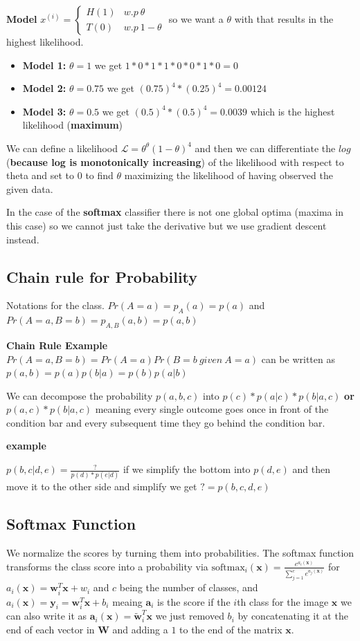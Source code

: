 \documentclass[twocolumn, letter, 10pt, landscape]{article}
\newcommand{\mb}{\mathbf}
\newcommand{\tb}{\textbf}
\newcommand{\bit}{\vspace{-0.1in}\begin{itemize}\setlength\itemsep{-0.05in}}
\newcommand{\eit}{\end{itemize}\vspace{-0.1in}}
\begin{document}
\tb{Model} $x^{(i)}= \begin{cases} H (1)& w.p \: \theta \\ T (0) & w.p \: 1-\theta \end{cases}$ so we want a $\theta$ with that results in the highest likelihood.

\bit{}
\item \tb{Model 1:} $\theta = 1$ we get $1*0*1*1*0*0*1*0 = 0$
\item \tb{Model 2:} $\theta = 0.75$ we get $(0.75)^4*(0.25)^4 = 0.00124$
\item \tb{Model 3:} $\theta = 0.5$ we get $(0.5)^4*(0.5)^4 = 0.0039$ which is the highest likelihood (\tb{maximum})
\eit{}

We can define a likelihood $\mathcal{L} = \theta^\theta(1-\theta)^4$ and then we can differentiate the $log$ (\tb{because log is monotonically increasing}) of the likelihood with respect to theta and set to $0$ to find $\theta$ maximizing the likelihood of having observed the given data.

In the case of the \tb{softmax} classifier there is not one global optima (maxima in this case) so we cannot just take the derivative but we use gradient descent instead.

\subsection{Chain rule for Probability}
Notations for the class. $Pr(A=a)= p_A(a) = p(a)$ and $Pr(A=a, B=b) = p_{A,B}(a,b)=p(a,b)$

\tb{Chain Rule Example}
$Pr(A=a, B=b) = Pr(A=a)Pr(B=b \: given \: A=a)$ can be written as $p(a,b) = p(a)p(b|a) = p(b)p(a|b)$

We can decompose the probability $p(a,b,c)$ into $p(c)*p(a|c)*p(b|a,c)$ \tb{or} $p(a,c)*p(b|a,c)$ meaning every single outcome goes once in front of the condition bar and every subsequent time they go behind the condition bar.

\tb{example}

$p(b,c|d,e) = \frac{?}{p(d)*p(e|d)}$ if we simplify the bottom into $p(d,e)$ and then move it to the other side and simplify we get $? = p(b,c,d,e)$

\subsection{Softmax Function}
We normalize the scores by turning them into probabilities. The softmax function transforms the class score into a probability via $\text{softmax}_i(\mb{x}) = \frac{e^{a_i(\mb{x})}}{\sum_{j=1}^{c}e^{a_j(\mb{x})}}$ for $a_i(\mb{x}) = \mb{w}_i^T\mb{x}+w_i$ and $c$ being the number of classes, and $a_i(\mb{x}) = \mb{y}_i = \mb{w}_i^T\mb{x}+b_i$ meaing $\mb{a}_i$ is the score if the $i$th class for the image $\mb{x}$ we can also write it as $\mb{a}_i(\mb{x}) = \tilde{\mb{w}}_i^T\mb{x}$ we just removed $b_i$ by concatenating it at the end of each vector in $\mb{W}$ and adding a $1$ to the end of the matrix $\mb{x}$. 
\end{document}
